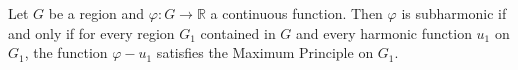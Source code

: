 Let $G$ be a region and $\varphi: G \to \mathbb{R}$ a continuous function. Then $\varphi$ is subharmonic if and only if for every region $G_1$ contained in $G$ and every harmonic function $u_1$ on $G_1$, the function $\varphi - u_1$ satisfies the Maximum Principle on $G_1$.
